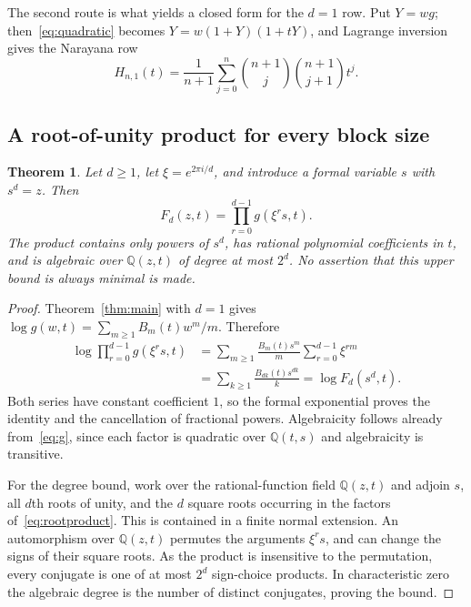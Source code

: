 \documentclass[11pt]{article}
\numberwithin{equation}{section}
\newtheorem{theorem}{Theorem}[section]
\theoremstyle{definition}
\newcommand{\Q}{\mathbb Q}
\begin{document}
The second route is what yields a closed form for the $d=1$ row. Put
$Y=wg$; then~\eqref{eq:quadratic} becomes $Y=w(1+Y)(1+tY)$, and Lagrange
inversion gives the Narayana row
\begin{equation}
 \boxed{H_{n,1}(t)=\frac1{n+1}\sum_{j=0}^{n}
              \binom{n+1}{j}\binom{n+1}{j+1}t^j.}
 \label{eq:d1row}
\end{equation}

\subsection{A root-of-unity product for every block size}
\begin{theorem}
\label{thm:rootproduct}
Let $d\geq1$, let $\xi=e^{2\pi i/d}$, and introduce a formal variable $s$ with
$s^d=z$. Then
\begin{equation}
 \boxed{F_d(z,t)=\prod_{r=0}^{d-1}g(\xi^r s,t).}\label{eq:rootproduct}
\end{equation}
The product contains only powers of $s^d$, has rational polynomial
coefficients in $t$, and is algebraic over $\Q(z,t)$ of degree at most $2^d$.
No assertion that this upper bound is always minimal is made.
\end{theorem}
\begin{proof}
Theorem~\ref{thm:main} with $d=1$ gives
$\log g(w,t)=\sum_{m\geq1}B_m(t)w^m/m$. Therefore
\begin{align*}
 \log\prod_{r=0}^{d-1}g(\xi^rs,t)
 &=\sum_{m\geq1}\frac{B_m(t)s^m}{m}
                          \sum_{r=0}^{d-1}\xi^{rm}\\
 &=\sum_{k\geq1}\frac{B_{dk}(t)s^{dk}}{k}
 =\log F_d(s^d,t).
\end{align*}
Both series have constant coefficient $1$, so the formal exponential proves
the identity and the cancellation of fractional powers. Algebraicity follows
already from~\eqref{eq:g}, since each factor is quadratic over
$\Q(t,s)$ and algebraicity is transitive.

For the degree bound, work over the rational-function field $\Q(z,t)$ and
adjoin $s$, all $d$th roots of unity, and the $d$ square roots occurring in
the factors of~\eqref{eq:rootproduct}. This is contained in a finite normal
extension. An automorphism over $\Q(z,t)$ permutes the arguments $\xi^rs$,
and can change the signs of their square roots. As the product is insensitive
to the permutation, every conjugate is one of at most $2^d$ sign-choice
products. In characteristic zero the algebraic degree is the number of
distinct conjugates, proving the bound.
\end{proof}
\end{document}
